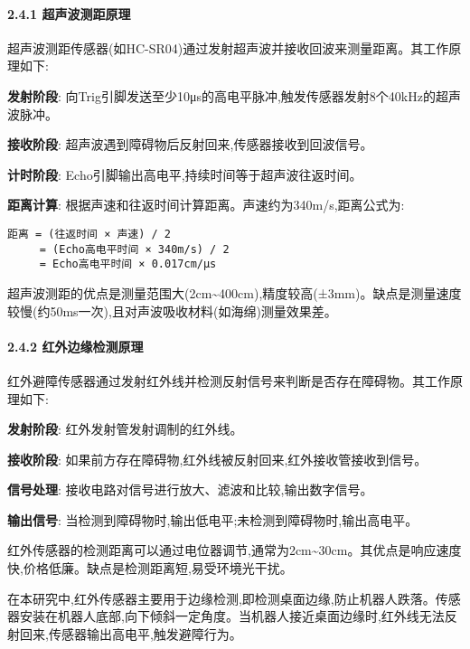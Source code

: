 \documentclass[
]{article}
\begin{document}
\hypertarget{ux8d85ux58f0ux6ce2ux6d4bux8dddux539fux7406}{%
\paragraph{2.4.1
超声波测距原理}\label{ux8d85ux58f0ux6ce2ux6d4bux8dddux539fux7406}}

超声波测距传感器(如HC-SR04)通过发射超声波并接收回波来测量距离。其工作原理如下:

\textbf{发射阶段}:
向Trig引脚发送至少10μs的高电平脉冲,触发传感器发射8个40kHz的超声波脉冲。

\textbf{接收阶段}: 超声波遇到障碍物后反射回来,传感器接收到回波信号。

\textbf{计时阶段}: Echo引脚输出高电平,持续时间等于超声波往返时间。

\textbf{距离计算}:
根据声速和往返时间计算距离。声速约为340m/s,距离公式为:

\begin{verbatim}
距离 = (往返时间 × 声速) / 2
     = (Echo高电平时间 × 340m/s) / 2
     = Echo高电平时间 × 0.017cm/μs
\end{verbatim}

超声波测距的优点是测量范围大(2cm\textasciitilde400cm),精度较高(±3mm)。缺点是测量速度较慢(约50ms一次),且对声波吸收材料(如海绵)测量效果差。

\hypertarget{ux7ea2ux5916ux8fb9ux7f18ux68c0ux6d4bux539fux7406}{%
\paragraph{2.4.2
红外边缘检测原理}\label{ux7ea2ux5916ux8fb9ux7f18ux68c0ux6d4bux539fux7406}}

红外避障传感器通过发射红外线并检测反射信号来判断是否存在障碍物。其工作原理如下:

\textbf{发射阶段}: 红外发射管发射调制的红外线。

\textbf{接收阶段}:
如果前方存在障碍物,红外线被反射回来,红外接收管接收到信号。

\textbf{信号处理}: 接收电路对信号进行放大、滤波和比较,输出数字信号。

\textbf{输出信号}:
当检测到障碍物时,输出低电平;未检测到障碍物时,输出高电平。

红外传感器的检测距离可以通过电位器调节,通常为2cm\textasciitilde30cm。其优点是响应速度快,价格低廉。缺点是检测距离短,易受环境光干扰。

在本研究中,红外传感器主要用于边缘检测,即检测桌面边缘,防止机器人跌落。传感器安装在机器人底部,向下倾斜一定角度。当机器人接近桌面边缘时,红外线无法反射回来,传感器输出高电平,触发避障行为。
\end{document}
